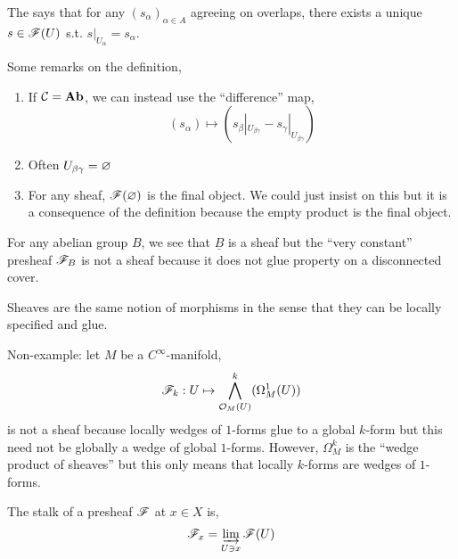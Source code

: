 \documentclass[12pt]{article}
\begin{document}
\begin{rmk}
The says that for any $(s_\alpha)_{\alpha \in A}$ agreeing on overlaps, there exists a unique $s \in \mathscr{F}(U)$ s.t. $s|_{U_\alpha} = s_\alpha$.
\end{rmk}

\begin{rmk}
Some remarks on the definition,
\begin{enumerate}
\item If $\mathcal{C} = \mathbf{Ab}$, we can instead use the ``difference'' map,
\[ (s_\alpha) \mapsto (s_\beta |_{U_{\beta \gamma}} - s_\gamma |_{U_{\beta \gamma}}) \]
\item Often $U_{\beta \gamma} = \varnothing$
\item For any sheaf, $\mathscr{F}(\varnothing)$ is the final object. We could just insist on this but it is a consequence of the definition because the empty product is the final object.
\end{enumerate}
\end{rmk}

\begin{example}
For any abelian group $B$, we see that $\underline{B}$ is a sheaf but the ``very constant'' presheaf $\mathscr{F}_B$ is not a sheaf because it does not glue property on a disconnected cover. 
\end{example}

\begin{example}
Sheaves are the same notion of morphisms in the sense that they can be locally specified and glue.
\end{example}

\begin{example}
Non-example: let $M$ be a $C^\infty$-manifold,
\[ \mathscr{F}_k : U \mapsto \bigwedge^k_{\mathcal{O}_{M}(U)}(\Omega^1_M(U)) \]
is not a sheaf because locally wedges of $1$-forms glue to a global $k$-form but this need not be globally a wedge of global $1$-forms. However, $\Omega^k_M$ is the ``wedge product of sheaves'' but this only means that locally $k$-forms are wedges of $1$-forms.
\end{example}

\begin{defn}
The stalk of a presheaf $\mathscr{F}$ at $x \in X$ is,
\[ \mathscr{F}_x = \varinjlim_{U \ni x} \mathscr{F}(U) \]
\end{defn}
\end{document}
